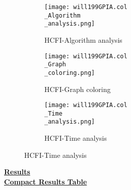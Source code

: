 \documentclass[10pt]{article}
\begin{document}
\graphicspath{{./Core1/Solutions/HCFI/will199GPIA.col}}
\begin{figure}[H]
\begin{subfigure}{.33\textwidth}
  \centering
  \texttt{[image: will199GPIA.col\\\_Algorithm\\\_analysis.png]}
  \caption{HCFI-Algorithm analysis}
   \label{fig:subfig1}
\end{subfigure}%
\begin{subfigure}{.33\textwidth}
  \centering
  \texttt{[image: will199GPIA.col\\\_Graph\\\_coloring.png]}
  \caption{HCFI-Graph coloring}
  \label{fig:subfig2}
\end{subfigure}
\begin{subfigure}{.33\textwidth}
  \centering
  \texttt{[image: will199GPIA.col\\\_Time\\\_analysis.png]}
  \caption{HCFI-Time analysis}
  \end{subfigure}
\end{figure}
\vspace{2cm}
\begin{center}
\hyperlink{page.8}{\textbf{Results}}\\
\vspace{0.5cm}
\hyperlink{page.71}{\textbf{Compact Results Table}}
\end{center}
\pagebreak
\end{document}
